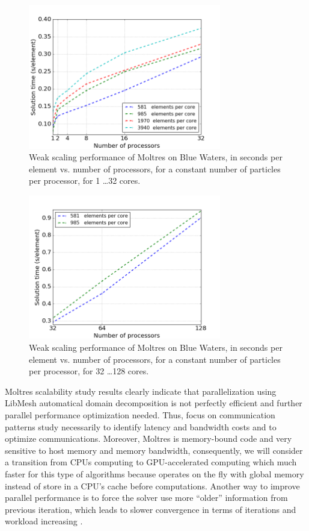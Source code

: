 \documentclass{article}
\begin{document}
\begin{figure}[htpb]
  \centering
  \includegraphics[width=0.75\textwidth]{intra-node_weak.png}
  \caption{Weak scaling performance of Moltres on Blue Waters, in seconds per element vs. number of processors, for a constant number of particles
per processor, for 1 \ldots 32 cores.}
  \label{fig:intra_weak}
\end{figure} 

\begin{figure}[htpb]
  \centering
  \includegraphics[width=0.75\textwidth]{extra-node_weak.png}
  \caption{Weak scaling performance of Moltres on Blue Waters, in seconds per element vs. number of processors, for a constant number of particles
per processor, for 32 \ldots 128 cores.}
  \label{fig:extra_weak}
\end{figure} 

Moltres scalability study results clearly indicate that parallelization using LibMesh automatical domain decomposition is not perfectly efficient and
 further parallel performance optimization needed. Thus, focus on communication patterns study necessarily to identify latency and bandwidth costs
 and to optimize communications. Moreover, Moltres is memory-bound code and very sensitive to host memory and memory bandwidth, consequently, we will
 consider a transition from CPUs computing to GPU-accelerated computing which much faster for this type of algorithms because operates on the fly with global 
 memory instead of store in a CPU's cache before computations. Another way to improve parallel performance is to force the solver use more ``older'' 
 information from previous iteration, which leads to slower convergence in terms of iterations and workload increasing \cite{satish_balay_petsc_2015}.
\end{document}
